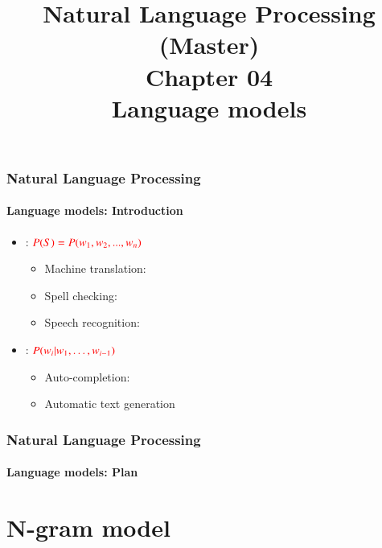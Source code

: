 \documentclass[xcolor=table]{beamer}
\title[ESI - NLP(master): 04- Language models]%
{Natural Language Processing (Master)\\Chapter 04\\Language models}
\begin{document}
	
\begin{frame}
\frametitle{Natural Language Processing}
\framesubtitle{Language models: Introduction}

\begin{itemize}
	\item {}: $\color{red} P(S) = P(w_1, w_2, ..., w_n) $
	\begin{itemize}
		\item Machine translation: \\
		\item Spell checking: \\
		\item Speech recognition: \\
	\end{itemize}
	\item {}: $\color{red} P(w_i | w_1, \ldots, w_{i-1}) $
	\begin{itemize}
		\item Auto-completion: \\
		\item Automatic text generation
	\end{itemize}
\end{itemize}

\end{frame}


\begin{frame}
\frametitle{Natural Language Processing}
\framesubtitle{Language models: Plan}

\begin{multicols}{2}
\tableofcontents
\end{multicols}
\end{frame}

\section{N-gram model}
\end{document}
